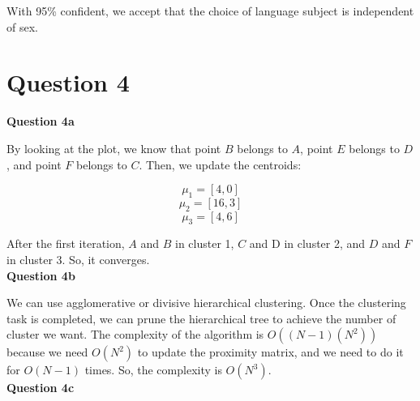 \documentclass[11pt,a4paper]{report}
\begin{document}
\begin{multicols*}{2}
\noindent With 95\% confident, we accept that the choice of language subject is independent of sex.

\section{Question 4}

\noindent \textbf{Question 4a}


\noindent By looking at the plot, we know that point $B$ belongs to $A$, point $E$ belongs to $D$, and point $F$ belongs to $C$. Then, we update the centroids:

$$\mu_1 = [4,0]$$
$$\mu_2 = [16,3]$$
$$\mu_3 = [4,6]$$


\noindent After the first iteration, $A$ and $B$ in cluster 1, $C$ and D in cluster 2, and $D$ and $F$ in cluster 3. So, it converges.\\

\noindent \textbf{Question 4b}

\noindent We can use agglomerative or divisive hierarchical clustering. Once the clustering task is completed, we can prune the hierarchical tree to achieve the number of cluster we want. The complexity of the algorithm is $O((N-1)(N^2))$ because we need $O(N^2)$ to update the proximity matrix, and we need to do it for $O(N-1)$ times. So, the complexity is $O(N^3)$.\\

\noindent \textbf{Question 4c}

\begin{center}
\end{center}
\end{multicols*}
\end{document}
